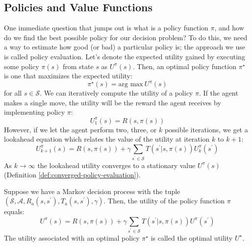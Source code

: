 \documentclass[11pt]{article}
\theoremstyle{definition}
\begin{document}
\subsection{Policies and Value Functions}
One immediate question that jumps out is what is a policy function $\pi$, and how do we find the best possible policy for our decision problem? 
To do this, we need a way to estimate how good (or bad) a particular policy is; the approach we use is called policy evaluation. 
Let's denote the expected utility gained by executing some policy $\pi(s)$ from state $s$ as $U^{\pi}(s)$. 
Then, an optimal policy function $\pi^{\star}$ is one that maximizes the expected utility:
\begin{equation}
\pi^{\star}\left(s\right) = \text{arg max}~U^{\pi}(s)
\end{equation}
for all $s\in\mathcal{S}$. We can iteratively compute the utility of a policy $\pi$. 
If the agent makes a single move, the utility will be the reward the agent receives by implementing policy $\pi$:
\begin{equation}
U_{1}^{\pi}(s) = R(s,\pi(s))
\end{equation}
However, if we let the agent perform two, three, or $k$ possible iterations, we get a lookahead equation which relates the value of 
the utility at iteration $k$ to $k+1$:
\begin{equation}
U_{k+1}^{\pi}(s) = R(s,\pi(s)) + \gamma\sum_{s^{\prime}\in\mathcal{S}}T(s^{\prime} | s, \pi(s))U_{k}^{\pi}(s^{\prime})
\end{equation}
As $k\rightarrow\infty$ the lookahead utility converges to a stationary value $U^{\pi}(s)$ (Definition \ref{def:converged-policy-evaluation}).
\begin{definition}\label{def:converged-policy-evaluation}
Suppose we have a Markov decision process with the tuple $\left(\mathcal{S}, \mathcal{A}, R_{a}\left(s, s^{\prime}\right), T_{a}\left(s,s^{\prime}\right), \gamma\right)$. 
Then, the utility of the policy function $\pi$ equals:
\begin{equation}
U^{\pi}(s) = R(s,\pi(s)) + \gamma\sum_{s^{\prime}\in\mathcal{S}}T(s^{\prime} | s, \pi(s))U^{\pi}(s^{\prime})
\end{equation}
The utility associated with an optimal policy $\pi^{\star}$ is called the optimal utility $U^{\star}$. 
\end{definition}
\end{document}
